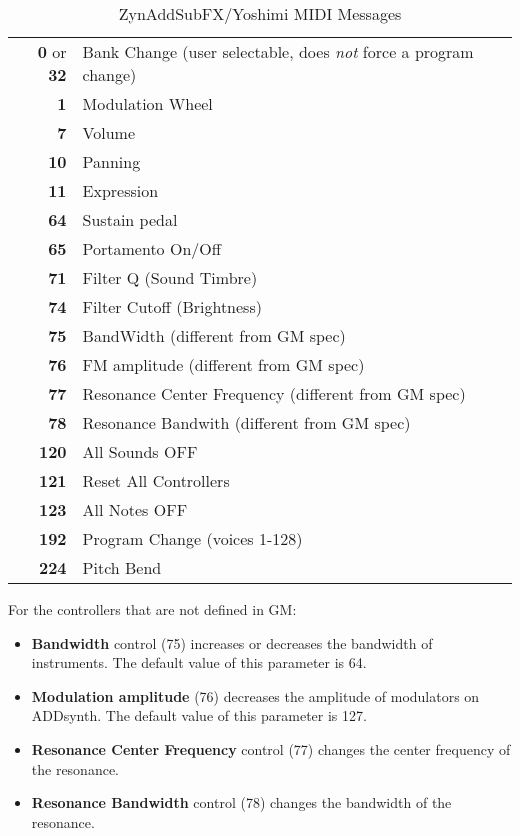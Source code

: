    \begin{table}
      \caption{ZynAddSubFX/Yoshimi MIDI Messages}
      \label{table:zynaddsubfx_midi_messages}
      \begin{tabular}{r l}
         \textbf{0} or \textbf{32} &
            Bank Change (user selectable, does \textsl{not} force a program
            change) \\
         \textbf{1} &
            Modulation Wheel \\
         \textbf{7} &
            Volume \\
         \textbf{10} &
            Panning \\
         \textbf{11} &
            Expression \\
         \textbf{64} &
            Sustain pedal \\
         \textbf{65} &
            Portamento On/Off \\
         \textbf{71} &
            Filter Q (Sound Timbre) \\
         \textbf{74} &
            Filter Cutoff (Brightness) \\
         \textbf{75} &
            BandWidth (different from GM spec) \\
         \textbf{76} &
            FM amplitude (different from GM spec) \\
         \textbf{77} &
            Resonance Center Frequency (different from GM spec) \\
         \textbf{78} &
            Resonance Bandwith (different from GM spec) \\
         \textbf{120} &
            All Sounds OFF \\
         \textbf{121} &
            Reset All Controllers \\
         \textbf{123} &
            All Notes OFF \\
         \textbf{192} &
            Program Change (voices 1-128) \\
         \textbf{224} &
            Pitch Bend \\
      \end{tabular}
   \end{table}

   For the controllers that are not defined in GM:

   \begin{itemize}
      \item \textbf{Bandwidth} control (75) increases or decreases the bandwidth
      of instruments. The default value of this parameter is 64. 
      \item \textbf{Modulation amplitude} (76) decreases the amplitude of
      modulators on ADDsynth. The default value of this parameter is 127. 
      \item \textbf{Resonance Center Frequency} control (77) changes the center
      frequency of the resonance. 
      \item \textbf{Resonance Bandwidth} control (78) changes the bandwidth of the
      resonance. 
   \end{itemize}

